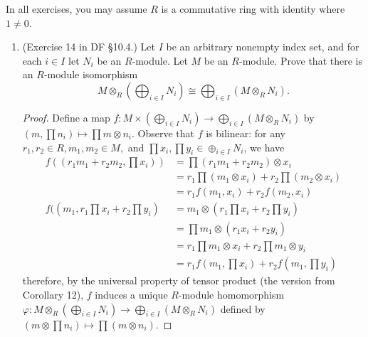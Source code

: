 \documentclass[10pt]{article}
\begin{document}
In all exercises, you may assume $R$ is a commutative ring with identity where $1 \neq 0$.

\begin{enumerate}

\item (Exercise 14 in DF \S 10.4.) Let $I$ be an arbitrary nonempty index set, and for each $i \in I$ let $N_i$ be an $R$-module.  Let $M$ be an $R$-module.  Prove that there is an $R$-module isomorphism
$$
M \otimes_R \left( \bigoplus_{i \in I} N_i \right) \cong \bigoplus_{i \in I} (M \otimes_R N_i).
$$

\begin{proof}

Define a map $f: M \times \left( \bigoplus_{i \in I} N_i \right) \rightarrow \bigoplus_{i \in I} (M \otimes_R N_i)$ by $(m, \prod n_i) \mapsto \prod m \otimes n_i$.  Observe that $f$ is bilinear: for any $r_1, r_2 \in R, m_1, m_2 \in M,$ and $\prod x_i, \prod y_i \in \oplus_{i \in I} N_i$, we have
\begin{align*}
f((r_1m_1 + r_2m_2, \prod x_i))
&=
\prod(r_1m_1 + r_2m_2) \otimes x_i
\\
&= r_1 \prod(m_1 \otimes x_i) + r_2 \prod (m_2 \otimes x_i)
\\
&= r_1 f(m_1, x_i) + r_2 f(m_2, x_i)
\\
f((m_1, r_1\prod x_i + r_2 \prod y_i)
&=
m_1 \otimes (r_1\prod x_i + r_2 \prod y_i)
\\
&= \prod m_1 \otimes (r_1 x_i + r_2 y_i)
\\
&= r_1 \prod m_1 \otimes x_i + r_2 \prod m_1 \otimes y_i
\\
&= r_1 f(m_1, \prod x_i) + r_2 f(m_1, \prod y_i)
\end{align*}
therefore, by the universal property of tensor product (the version from Corollary 12), $f$ induces a unique $R$-module homomorphism $\varphi : M \otimes_R \left( \bigoplus_{i \in I} N_i \right) \rightarrow \bigoplus_{i \in I} (M \otimes_R N_i)$ defined by $(m \otimes \prod n_i) \mapsto \prod(m \otimes n_i)$.



\end{proof}
\end{enumerate}
\end{document}
